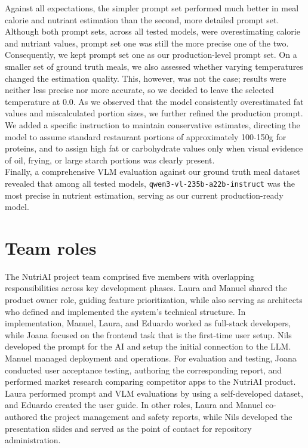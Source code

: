 \documentclass[11pt,a4paper]{article}
\begin{document}
Against all expectations, the simpler prompt set performed much better in meal calorie and nutriant estimation than the second, more detailed prompt set.
Although both prompt sets, across all tested models, were overestimating calorie and nutriant values, prompt set one was still the more precise one of the two. Consequently, we kept prompt set one as our production-level prompt set.
On a smaller set of ground truth meals, we also assessed whether varying temperatures changed the estimation quality. This, however, was not the case; results were neither less precise nor more accurate, so we decided to leave the selected temperature at 0.0.
As we observed that the model consistently overestimated fat values and miscalculated portion sizes, we further refined the production prompt. We added a specific instruction to maintain conservative estimates, directing the model to assume standard restaurant portions of approximately 100-150g for proteins, and to assign high fat or carbohydrate values only when visual evidence of oil, frying, or large starch portions was clearly present.
\\
Finally, a comprehensive VLM evaluation against our ground truth meal dataset revealed that among all tested models, \texttt{qwen3-vl-235b-a22b-instruct} was the most precise in nutrient estimation, serving as our current production-ready model.

\FloatBarrier
\section{Team roles}

\noindent
The NutriAI project team comprised five members with overlapping responsibilities across key development phases. Laura and Manuel shared the product owner role, guiding feature prioritization, while also serving as architects who defined and implemented the system's technical structure. In implementation, Manuel, Laura, and Eduardo worked as full-stack developers, while Joana focused on the frontend task that is the first-time user setup. Nils developed the prompt for the AI and setup the initial connection to the LLM. Manuel managed deployment and operations. For evaluation and testing, Joana conducted user acceptance testing, authoring the corresponding report, and performed market research comparing competitor apps to the NutriAI product. Laura performed prompt and VLM evaluations by using a self-developed dataset, and Eduardo created the user guide. In other roles, Laura and Manuel co-authored the project management and safety reports, while Nils developed the presentation slides and served as the point of contact for repository administration.
\end{document}
